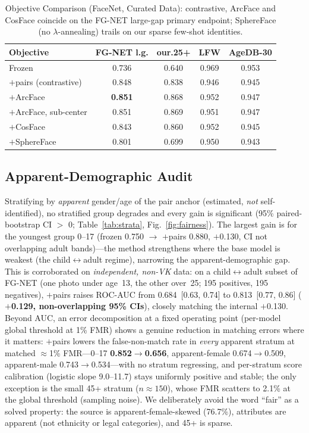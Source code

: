 \documentclass[journal]{IEEEtran}
\begin{document}
\begin{table}[!t]
\renewcommand{\arraystretch}{1.2}
\caption{Objective Comparison (FaceNet, Curated Data): contrastive, ArcFace and CosFace coincide on the FG-NET large-gap primary endpoint; SphereFace (no $\lambda$-annealing) trails on our sparse few-shot identities.}
\label{tab:objective}
\centering
\footnotesize
\begin{tabular}{@{}lcccc@{}}
\toprule
Objective & FG-NET l.g. & our.25+ & LFW & AgeDB-30 \\
\midrule
Frozen & 0.736 & 0.640 & 0.969 & 0.953 \\
$+$pairs (contrastive) & 0.848 & 0.838 & 0.946 & 0.945 \\
$+$ArcFace & \textbf{0.851} & 0.868 & 0.952 & 0.947 \\
$+$ArcFace, sub-center & 0.851 & 0.869 & 0.951 & 0.947 \\
$+$CosFace & 0.843 & 0.860 & 0.952 & 0.945 \\
$+$SphereFace & 0.801 & 0.699 & 0.950 & 0.943 \\
\bottomrule
\end{tabular}
\end{table}

\subsection{Apparent-Demographic Audit}\label{sec:res-fairness}
Stratifying by \emph{apparent} gender/age of the pair anchor (estimated, \emph{not} self-identified), no stratified group degrades and every gain is significant (95\% paired-bootstrap CI $>$ 0; Table~\ref{tab:strata}, Fig.~\ref{fig:fairness}). The largest gain is for the youngest group 0--17 (frozen 0.750 $\rightarrow$ $+$pairs 0.880, $+$0.130, CI not overlapping adult bands)---the method strengthens where the base model is weakest (the child$\leftrightarrow$adult regime), narrowing the apparent-demographic gap. This is corroborated on \emph{independent, non-VK} data: on a child$\leftrightarrow$adult subset of FG-NET (one photo under age~13, the other over~25; 195 positives, 195 negatives), $+$pairs raises ROC-AUC from 0.684~[0.63, 0.74] to 0.813~[0.77, 0.86] (\textbf{$+$0.129, non-overlapping 95\% CIs}), closely matching the internal $+$0.130. Beyond AUC, an error decomposition at a fixed operating point (per-model global threshold at 1\% FMR) shows a genuine reduction in matching errors where it matters: $+$pairs lowers the false-non-match rate in \emph{every} apparent stratum at matched $\approx$1\% FMR---0--17 \textbf{0.852$\rightarrow$0.656}, apparent-female 0.674$\rightarrow$0.509, apparent-male 0.743$\rightarrow$0.534---with no stratum regressing, and per-stratum score calibration (logistic slope 9.0--11.7) stays uniformly positive and stable; the only exception is the small 45+ stratum ($n{\approx}150$), whose FMR scatters to 2.1\% at the global threshold (sampling noise). We deliberately avoid the word ``fair'' as a solved property: the source is apparent-female-skewed (76.7\%), attributes are apparent (not ethnicity or legal categories), and 45+ is sparse.
\end{document}
